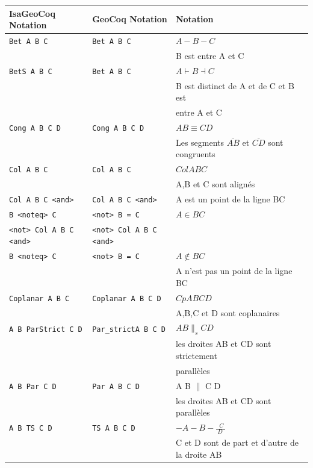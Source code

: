\documentclass[8pt,a4paper]{article}
\theoremstyle{plain}
\begin{document}
\begin{tabular}{|l|l|l|}
  \hline
  IsaGeoCoq Notation & GeoCoq Notation & Notation \\
  \hline
  \verb+Bet A B C+ & \verb+Bet A B C+ & $A - B - C$ \\
  &&B est entre A et C\\
    \hline
    \verb+BetS A B C+ & \verb+Bet A B C+ & $A \vdash B \dashv C$ \\
    && B est distinct de A et de C et B est \\
    && entre A et C \\
    \hline
    
  \verb+Cong A B C D+ & \verb+Cong A B C D+ & $A B \equiv C D$ \\
  &&Les segments $\overline{AB}$ et $\overline{CD}$ sont congruents\\
    \hline

  \verb+Col A B C+ &\verb+Col A B C+ &$Col A B C$ \\
  &&A,B et C sont alignés \\
  \hline
  
  \verb+Col A B C <and>+ & \verb+Col A B C <and>+ &A est un point de la ligne BC\\
  \verb+B <noteq> C+ &  \verb+<not> B = C+ &$A \in BC$\\

    \hline

    \verb+<not> Col A B C <and>+ & \verb+<not> Col A B C <and>+ \\
    \verb+B <noteq> C+ & \verb+<not> B = C+&$A \not\in BC$\\
    &&A n'est pas un point de la ligne BC\\
    \hline

  \verb+Coplanar A B C+ &\verb+Coplanar A B C D+ &$Cp A B C D$ \\
  &&A,B,C et D sont coplanaires\\
    \hline

  \verb+A B ParStrict C D+ &\verb+Par_strictA B C D + &$A B \parallel_{s} C D$ \\
  &&les droites AB et CD sont strictement \\
  &&parallèles\\
    \hline

  \verb+A B Par C D+ &\verb+Par A B C D+ &A B $\parallel$ C D \\
  &&les droites AB et CD sont parallèles\\
    \hline

  \verb+A B TS C D+ & \verb+TS A B C D+ & $-A - B- \frac{\ \ C\ }{\ D\ \ }$ \\
  &&C et D sont de part et d'autre de la droite AB \\
    \hline


\end{tabular}
\end{document}
